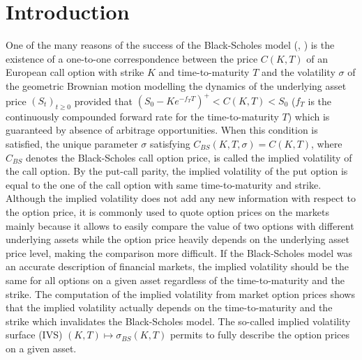 \section{Introduction}
One of the many reasons of the success of the Black-Scholes model (\citeauthor{black1973pricing}, \citeyear{black1973pricing}) is the existence of a one-to-one correspondence between the price $C(K,T)$ of an European call option with strike $K$ and time-to-maturity $T$ and the volatility $\sigma$ of the geometric Brownian motion modelling the dynamics of the underlying asset price $(S_t)_{t\ge0}$ provided that $(S_0-Ke^{-f_T T})^+ < C(K,T) < S_0$ ($f_T$ is the continuously compounded forward rate for the time-to-maturity $T$) which is guaranteed by absence of arbitrage opportunities. When this condition is satisfied, the unique parameter $\sigma$ satisfying $C_{BS}(K,T,\sigma)=C(K,T)$, where $C_{BS}$ denotes the Black-Scholes call option price, is called the implied volatility of the call option. By the put-call parity, the implied volatility of the put option is equal to the one of the call option with same time-to-maturity and strike. Although the implied volatility does not add any new information with respect to the option price, it is commonly used to quote option prices on the markets mainly because it allows to easily compare the value of two options with different underlying assets while the option price heavily depends on the underlying asset price level, making the comparison more difficult. If the Black-Scholes model was an accurate description of financial markets, the implied volatility should be the same for all options on a given asset regardless of the time-to-maturity and the strike. The computation of the implied volatility from market option prices shows that the implied volatility actually depends on the time-to-maturity and the strike which invalidates the Black-Scholes model. The so-called implied volatility surface (IVS) $(K,T)\mapsto \sigma_{BS}(K,T)$ permits to fully describe the option prices on a given asset. \\

